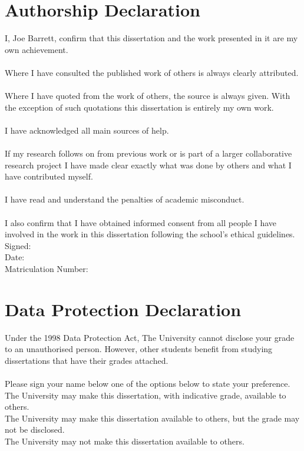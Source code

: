 \thispagestyle{empty}
\section*{Authorship Declaration}
I, Joe Barrett, confirm that this dissertation and the work presented in it are my own achievement.
\\\\
Where I have consulted the published work of others is always clearly attributed.
\\\\
Where I have quoted from the work of others, the source is always given. With the exception of such quotations this dissertation is entirely my own work.
\\\\
I have acknowledged all main sources of help.
\\\\
If my research follows on from previous work or is part of a larger collaborative research project I have made clear exactly what was done by others and what I have contributed myself.
\\\\
I have read and understand the penalties of academic misconduct.
\\\\
I also confirm that I have obtained informed consent from all people I have involved in the work in this dissertation following the school's ethical guidelines.
\vspace{2cm}\\
Signed:
\vspace{2cm}\\
Date:
\vspace{2cm}\\
Matriculation Number:
\newpage
\thispagestyle{empty}
\section*{Data Protection Declaration}
Under the 1998 Data Protection Act, The University cannot disclose your grade to an unauthorised person. However, other students benefit from studying dissertations that have their grades attached.
\\\\
Please sign your name below one of the options below to state your preference.
\vspace{3cm}\\
The University may make this dissertation, with indicative grade, available to others.
\vspace{3cm}\\
The University may make this dissertation available to others, but the grade may not be disclosed.
\vspace{3cm}\\
The University may not make this dissertation available to others.
\newpage
